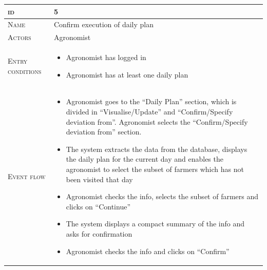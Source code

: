 

\begin{table}[H]
    \centering
    \begin{tabular}[c]{|l|p{}|}
        \hline %
    	\textsc{id}                 &   5\\
    	\hline %
    	\textsc{Name}               &   Confirm execution of daily plan\\
    	\hline %
    	\textsc{Actors}             &   Agronomist\\
    	\hline %
    	\textsc{Entry conditions}   &   \begin{itemize}
                                    	    \item Agronomist has logged in
                                    	    \item Agronomist has at least one daily plan
                                        \end{itemize}\\
    	\hline %
    	\textsc{Event flow}         &   %
            	                        \begin{itemize}
                                    	    \item Agronomist goes to the “Daily Plan” section, which is divided in “Visualise/Update” and “Confirm/Specify deviation from”. Agronomist selects the “Confirm/Specify deviation from” section.
                                    		\item The system extracts the data from the database, displays the daily plan for the current day and enables the agronomist to select the subset of farmers which has not been visited that day
                                            \item Agronomist checks the info, selects the subset of farmers and clicks on “Continue”
                                            \item The system displays a compact summary of the info and asks for confirmation
                                            \item Agronomist checks the info and clicks on “Confirm”


\end{itemize}
\end{tabular}
\end{table}
